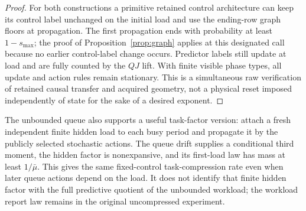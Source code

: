 \begin{proof}
For both constructions a primitive retained control architecture can keep its control label unchanged on the initial load and use the ending-row graph floors at propagation. The first propagation ends with probability at least $1-s_{\max}$; the proof of Proposition~\ref{prop:graph} applies at this designated call because no earlier control-label change occurs. Predictor labels still update at load and are fully counted by the $QJ$ lift. With finite visible phase types, all update and action rules remain stationary. This is a simultaneous raw verification of retained causal transfer and acquired geometry, not a physical reset imposed independently of state for the sake of a desired exponent.
\end{proof}

The unbounded queue also supports a useful task-factor version: attach a fresh independent finite hidden load to each busy period and propagate it by the publicly selected stochastic actions. The queue drift supplies a conditional third moment, the hidden factor is nonexpansive, and its first-load law has mass at least $1/\bar\mu$. This gives the same fixed-control task-compression rate even when later queue actions depend on the load. It does not identify that finite hidden factor with the full predictive quotient of the unbounded workload; the workload report law remains in the original uncompressed experiment.
